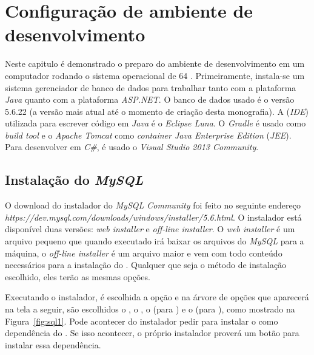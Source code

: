 \chapter{Configuração de ambiente de desenvolvimento}

Neste capitulo é demonstrado o preparo do ambiente de desenvolvimento em um computador rodando o sistema operacional  de 64 . Primeiramente, instala-se um sistema gerenciador de banco de dados para trabalhar tanto com a plataforma \textit{Java} quanto com a plataforma \textit{ASP.NET}.  O banco de dados usado é o  versão 5.6.22 (a versão mais atual até o momento de criação desta monografia). A  (\textit{IDE}) utilizada  para escrever código em \textit{Java} é o \textit{Eclipse Luna}. O \textit{Gradle} é usado como \textit{build tool} e o \textit{Apache Tomcat} como \textit{container Java Enterprise Edition} (\textit{JEE}). Para desenvolver em \textit{C\#}, é usado o \textit{Visual Studio 2013 Community}.  

\section{Instalação do \textit{MySQL}}

O download do instalador do \textit{MySQL Community} foi feito no seguinte endereço \textit{https://dev.mysql.com/downloads/windows/installer/5.6.html}. O instalador está disponível duas versões: \textit{web installer} e \textit{off-line installer}. O \textit{web installer} é um arquivo pequeno que quando executado irá baixar os arquivos do \textit{MySQL} para a máquina, o \textit{off-line installer} é um arquivo maior e vem com todo conteúdo necessários para a  instalação do . Qualquer que seja o método de instalação escolhido, eles terão as mesmas opções.

Executando o instalador, é escolhida a opção  e na árvore de opções que aparecerá na tela a seguir, são escolhidos o , o , o  (para ) e o  (para ), como mostrado na Figura~\ref{fig:sql1}. Pode acontecer do instalador pedir para instalar o  como dependência do . Se isso acontecer, o próprio instalador proverá um botão para instalar essa dependência.


